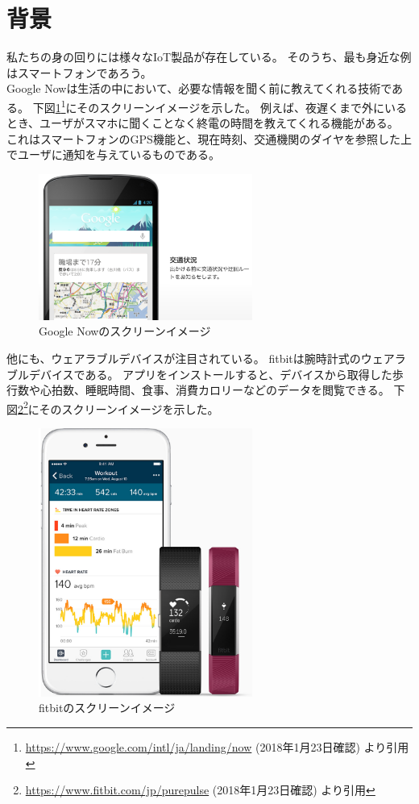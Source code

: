 \section{背景}
私たちの身の回りには様々なIoT製品が存在している。
そのうち、最も身近な例はスマートフォンであろう。 \\
Google Now\cite{google_now}は生活の中において、必要な情報を聞く前に教えてくれる技術である。
下図\ref{GoogleNow}\footnote{\url{https://www.google.com/intl/ja/landing/now} (2018年1月23日確認) より引用}にそのスクリーンイメージを示した。
例えば、夜遅くまで外にいるとき、ユーザがスマホに聞くことなく終電の時間を教えてくれる機能がある。
これはスマートフォンのGPS機能と、現在時刻、交通機関のダイヤを参照した上でユーザに通知を与えているものである。 \\
\begin{figure}[htbp]
 \centering
  \includegraphics[width=70mm]{image/GoogleNow.png}
 \caption{Google Nowのスクリーンイメージ}
 \label{GoogleNow}
\end{figure}
他にも、ウェアラブルデバイスが注目されている。
fitbit\cite{fitbit}は腕時計式のウェアラブルデバイスである。
アプリをインストールすると、デバイスから取得した歩行数や心拍数、睡眠時間、食事、消費カロリーなどのデータを閲覧できる。
下図\ref{fitbitImage}\footnote{\url{https://www.fitbit.com/jp/purepulse} (2018年1月23日確認) より引用}にそのスクリーンイメージを示した。
\begin{figure}[htbp]
 \centering
  \includegraphics[width=70mm]{image/fitbit.png}
 \caption{fitbitのスクリーンイメージ}
 \label{fitbitImage}
\end{figure}
